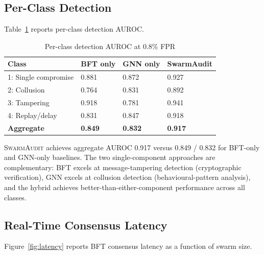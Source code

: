 \documentclass[sigconf,nonacm]{acmart}
\begin{document}
\subsection{Per-Class Detection}

Table~\ref{tab:perclass} reports per-class detection AUROC.

\begin{table}[h]
\caption{Per-class detection AUROC at 0.8\% FPR}
\label{tab:perclass}
\small
\begin{tabularx}{\columnwidth}{@{}p{2.6cm}X X X@{}}
\toprule
\textbf{Class} & \textbf{BFT only} & \textbf{GNN only} & \textbf{SwarmAudit} \\
\midrule
1: Single compromise & 0.881 & 0.872 & 0.927 \\
2: Collusion         & 0.764 & 0.831 & 0.892 \\
3: Tampering         & 0.918 & 0.781 & 0.941 \\
4: Replay/delay      & 0.831 & 0.847 & 0.918 \\
\midrule
\textbf{Aggregate}   & \textbf{0.849} & \textbf{0.832} & \textbf{0.917} \\
\bottomrule
\end{tabularx}
\end{table}

\textsc{SwarmAudit} achieves aggregate AUROC 0.917 versus 0.849 /
0.832 for BFT-only and GNN-only baselines. The two single-component
approaches are complementary: BFT excels at message-tampering
detection (cryptographic verification), GNN excels at
collusion detection (behavioural-pattern analysis), and the
hybrid achieves better-than-either-component performance across
all classes.

\subsection{Real-Time Consensus Latency}

Figure~\ref{fig:latency} reports BFT consensus latency as a
function of swarm size.
\end{document}
